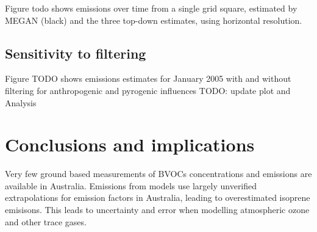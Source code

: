       
      Figure todo shows emissions over time from a single grid square, estimated by MEGAN (black) and the three top-down estimates, using \lowhr horizontal resolution.
  
    \subsection{Sensitivity to filtering}
    \label{BioIsop:uncertainty:filtering}
    
      Figure TODO shows emissions estimates for January 2005 with and without filtering for anthropogenic and pyrogenic influences
      TODO: update plot and Analysis
      
    
    
    
    
\section{Conclusions and implications}
  \label{BioIsop:conclusions}
  
  
  
  Very few ground based measurements of BVOCs concentrations and emissions are available in Australia.
  Emissions from models use largely unverified extrapolations for emission factors in Australia, leading to overestimated isoprene emisisons.
  This leads to uncertainty and error when modelling atmospheric ozone and other trace gases.
  
